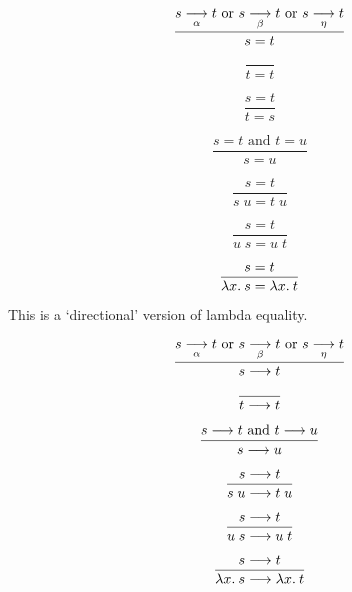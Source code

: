 \begin{slide*}


\vspace*{0.5cm}

\begin{red}

$$ \frac{s \mathrel{\mathop{\longrightarrow}\limits_{\alpha}} t \mbox{ or } s \mathrel{\mathop{\longrightarrow}\limits_{\beta}} t \mbox{ or } s \mathrel{\mathop{\longrightarrow}\limits_{\eta}} t}{s = t} $$

$$ \frac{}{t = t} $$

$$ \frac{s = t}{t = s} $$

$$ \frac{s = t \mbox{ and } t = u}{s = u} $$

$$ \frac{s = t}{s\; u = t\; u} $$

$$ \frac{s = t}{u\; s = u\; t} $$

$$ \frac{s = t}{\lambda x.\: s = \lambda x.\: t}$$

\end{red}

\end{slide*}



\begin{slide*}


This is a `directional' version of lambda equality.

\vspace*{0.5cm}

\begin{red}

$$ \frac{s \mathrel{\mathop{\longrightarrow}\limits_{\alpha}} t \mbox{ or } s \mathrel{\mathop{\longrightarrow}\limits_{\beta}} t \mbox{ or } s \mathrel{\mathop{\longrightarrow}\limits_{\eta}} t}{s \longrightarrow t}
$$

$$ \frac{}{t \longrightarrow t} $$

$$ \frac{s \longrightarrow t \mbox{ and } t \longrightarrow u}{s \longrightarrow u} $$

$$ \frac{s \longrightarrow t}{s\; u \longrightarrow t\; u} $$

$$ \frac{s \longrightarrow t}{u\; s \longrightarrow u\; t} $$

$$ \frac{s \longrightarrow t}{\lambda x.\: s \longrightarrow \lambda x.\: t}$$

\end{red}

\end{slide*}


